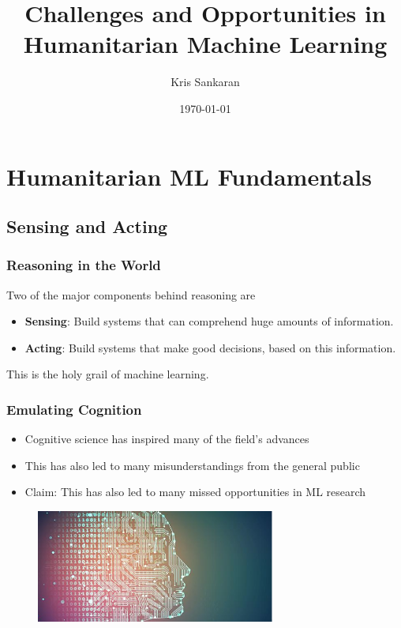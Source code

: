 \documentclass[10pt,mathserif]{beamer}
\title{\large \bfseries Challenges and Opportunities in \\
  Humanitarian Machine Learning}
\author{Kris Sankaran}
\date{\today}
\begin{document}
\maketitle

\section{Humanitarian ML Fundamentals}
\label{sec:label}

\subsection{Sensing and Acting}
\label{subsec:label}

\begin{frame}
  \frametitle{Reasoning in the World}
  Two of the major components behind reasoning are
  \begin{itemize}
    \item \textbf{Sensing}: Build systems that can comprehend huge amounts of
      information.
    \item \textbf{Acting}: Build systems that make good decisions, based on this
      information.
  \end{itemize}
  This is the holy grail of machine learning.
\end{frame}

\begin{frame}
  \frametitle{Emulating Cognition}
  \begin{itemize}
  \item Cognitive science has inspired many of the field's advances
  \item This has also led to many misunderstandings from the general public
  \item Claim: This has also led to many missed opportunities in ML research
  \end{itemize}
  \begin{figure}[ht]
    \centering
    \includegraphics[width=0.7\textwidth]{figures/ml_hype}
  \end{figure}
\end{frame}
\end{document}
